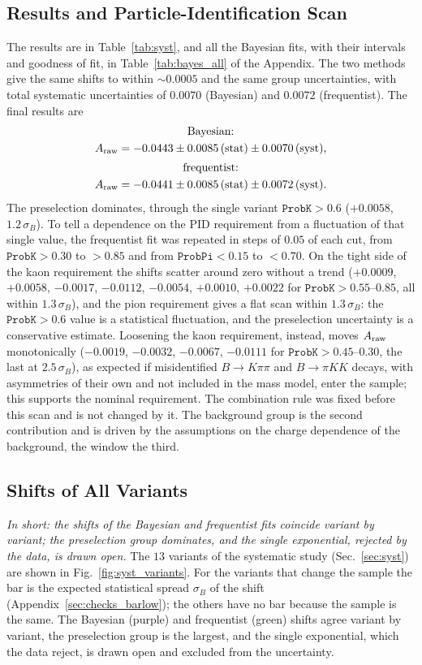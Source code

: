 \subsection{Results and Particle-Identification Scan}
The results are in Table~\ref{tab:syst}, and all the Bayesian fits, with their intervals and goodness of fit, in Table~\ref{tab:bayes_all} of the Appendix. The two methods give the same shifts to within $\sim$$0.0005$ and the same group uncertainties, with total systematic uncertainties of $0.0070$ (Bayesian) and $0.0072$ (frequentist). The final results are
\begin{gather*}
\text{Bayesian:}\\ A_{\mathrm{raw}}=-0.0443\pm0.0085\,(\text{stat})\pm0.0070\,(\text{syst}),\\[2pt]
\text{frequentist:}\\ A_{\mathrm{raw}}=-0.0441\pm0.0085\,(\text{stat})\pm0.0072\,(\text{syst}).
\end{gather*}
The preselection dominates, through the single variant $\texttt{ProbK}>0.6$ ($+0.0058$, $1.2\,\sigma_B$). To tell a dependence on the PID requirement from a fluctuation of that single value, the frequentist fit was repeated in steps of $0.05$ of each cut, from $\texttt{ProbK}>0.30$ to $>0.85$ and from $\texttt{ProbPi}<0.15$ to $<0.70$. On the tight side of the kaon requirement the shifts scatter around zero without a trend ($+0.0009$, $+0.0058$, $-0.0017$, $-0.0112$, $-0.0054$, $+0.0010$, $+0.0022$ for $\texttt{ProbK}>0.55$--$0.85$, all within $1.3\,\sigma_B$), and the pion requirement gives a flat scan within $1.3\,\sigma_B$: the $\texttt{ProbK}>0.6$ value is a statistical fluctuation, and the preselection uncertainty is a conservative estimate. Loosening the kaon requirement, instead, moves $A_{\mathrm{raw}}$ monotonically ($-0.0019$, $-0.0032$, $-0.0067$, $-0.0111$ for $\texttt{ProbK}>0.45$--$0.30$, the last at $2.5\,\sigma_B$), as expected if misidentified $B\to K\pi\pi$ and $B\to\pi KK$ decays, with asymmetries of their own and not included in the mass model, enter the sample; this supports the nominal requirement. The combination rule was fixed before this scan and is not changed by it. The background group is the second contribution and is driven by the assumptions on the charge dependence of the background, the window the third.

\subsection{Shifts of All Variants}
\label{app:syst_variants}
\emph{In short: the shifts of the Bayesian and frequentist fits coincide variant by variant; the preselection group dominates, and the single exponential, rejected by the data, is drawn open.}
The $13$ variants of the systematic study (Sec.~\ref{sec:syst}) are shown in Fig.~\ref{fig:syst_variants}. For the variants that change the sample the bar is the expected statistical spread $\sigma_B$ of the shift (Appendix~\ref{sec:checks_barlow}); the others have no bar because the sample is the same. The Bayesian (purple) and frequentist (green) shifts agree variant by variant, the preselection group is the largest, and the single exponential, which the data reject, is drawn open and excluded from the uncertainty.

